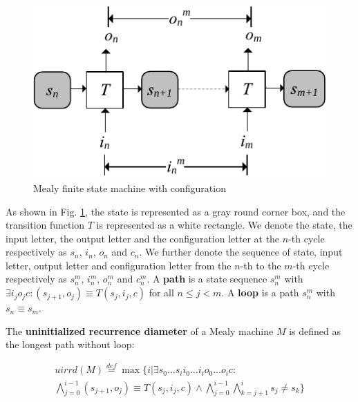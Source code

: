 \documentclass[journal]{IEEEtran}
\begin{document}
\begin{figure}[t]
\centering
\includegraphics{mealy}
\caption{Mealy finite state machine with configuration}
\label{mealy}
\end{figure}

As shown in Fig. \ref{mealy},
the state is represented as a gray round corner box,
and the transition function $T$ is represented as a white rectangle.
We denote the state, the input letter, the output letter and the configuration letter at the $n$-th cycle respectively as $s_n$, $i_n$, $o_n$ and $c_n$.
We further denote the sequence of state, input letter, output letter and configuration letter from the $n$-th to the $m$-th cycle respectively as $s_n^m$, $i_n^m$, $o_n^m$ and $c_n^m$.
A \textbf{path} is a state sequence $s_n^{m}$ with $\exists i_jo_jc:(s_{j+1},o_j)\equiv T(s_j,i_j,c)$ for all $n\le j< m$.
A \textbf{loop} is a path $s_n^{m}$ with $s_n\equiv s_m$.

The \textbf{uninitialized recurrence diameter} of a Mealy machine $M$ is defined
as the longest path without loop:

\begin{equation}\label{equ_uisvrd}
\begin{split}
uirrd(M)\stackrel{def}{=}\max\{i|\exists s_0 \dots s_i  i_0 \dots i_i o_0 \dots o_ic:\\
\bigwedge^{i-1}_{j=0}(s_{j+1},o_j)\equiv T(s_j,i_j,c)\wedge\bigwedge^{i-1}_{j=0}\bigwedge^{i}_{k=j+1}s_{j}\ne s_{k}\}
\end{split}
\end{equation}
\end{document}
